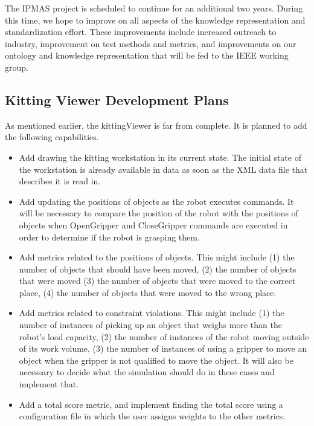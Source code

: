 The IPMAS project is scheduled to continue for an additional two years. During this time,
we hope to improve on all aspects of the knowledge representation and standardization
effort. These improvements include increased outreach to industry, improvement on
test methods and metrics, and improvements on our ontology and knowledge
representation that will be fed to the IEEE working group.

\subsection{Kitting Viewer Development Plans}

As mentioned earlier, the kittingViewer is far from complete. It is
planned to add the following capabilities.

\begin{itemize}

\item Add drawing the kitting workstation in its current state. The initial
  state of the workstation is already available in data as soon as the XML
  data file that describes it is read in.

\item Add updating the positions of objects as the robot executes commands.
  It will be necessary to compare the position of the robot with the
  positions of objects when OpenGripper and CloseGripper commands are
  executed in order to determine if the robot is grasping them.

\item Add metrics related to the positions of objects. This might include
  (1) the number of objects that should have been moved, (2) the number of
  objects that were moved (3) the number of objects that were moved to the
  correct place, (4) the number of objects that were moved to the wrong
  place.

\item Add metrics related to constraint violations. This might include (1)
  the number of instances of picking up an object that weighs more than the
  robot's load capacity, (2) the number of instances of the robot moving
  outside of its work volume, (3) the number of instances of using a
  gripper to move an object when the gripper is not qualified to move the
  object. It will also be necessary to decide what the simulation should do
  in these cases and implement that.

\item Add a total score metric, and implement finding the total score using
  a configuration file in which the user assigns weights to the other
  metrics.
\end{itemize} 

